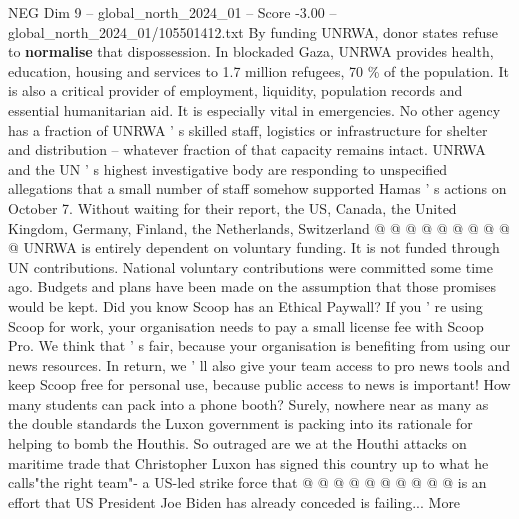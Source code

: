 \begin{textsample}{NEG Dim 9 – global\_north\_2024\_01 – Score -3.00 – global\_north\_2024\_01/105501412.txt}
By funding UNRWA, donor states refuse to \textbf{normalise} that dispossession.
In blockaded Gaza, UNRWA provides health, education, housing and services to 1.7 million refugees, 70 \% of the population.
It is also a critical provider of employment, liquidity, population records and essential humanitarian aid.
It is especially vital in emergencies.
No other agency has a fraction of UNRWA ' s skilled staff, logistics or infrastructure for shelter and distribution -- whatever fraction of that capacity remains intact.
UNRWA and the UN ' s highest investigative body are responding to unspecified allegations that a small number of staff somehow supported Hamas ' s actions on October 7.
Without waiting for their report, the US, Canada, the United Kingdom, Germany, Finland, the Netherlands, Switzerland @ @ @ @ @ @ @ @ @ @ UNRWA is entirely dependent on voluntary funding.
It is not funded through UN contributions.
National voluntary contributions were committed some time ago.
Budgets and plans have been made on the assumption that those promises would be kept.
Did you know Scoop has an Ethical Paywall?
If you ' re using Scoop for work, your organisation needs to pay a small license fee with Scoop Pro.
We think that ' s fair, because your organisation is benefiting from using our news resources.
In return, we ' ll also give your team access to pro news tools and keep Scoop free for personal use, because public access to news is important!
How many students can pack into a phone booth?
Surely, nowhere near as many as the double standards the Luxon government is packing into its rationale for helping to bomb the Houthis.
So outraged are we at the Houthi attacks on maritime trade that Christopher Luxon has signed this country up to what he calls"the right team"- a US-led strike force that @ @ @ @ @ @ @ @ @ @ is an effort that US President Joe Biden has already conceded is failing...
More

\end{textsample}
